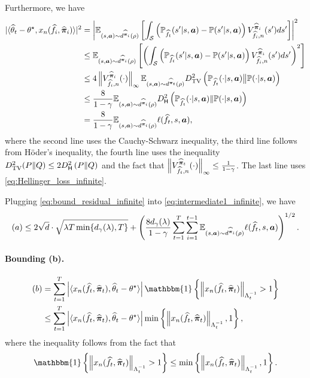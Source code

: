 Furthermore, we have
\begin{align}\label{eq:bound_residual_infinite}
|\langle \widehat{\theta}_t-\theta^\star,x_n(\widehat{f}_i,\widehat{{\bm{\pi}}}_i)\rangle|^2 &= \left|\mathbb{E}_{(s,{\bm{a}})\sim d^{\widehat{{\bm{\pi}}}_i}(\rho)}\left[\int_{\mathcal{S}} \left({\mathbb P}_{\widehat{f}_t}(s'|s,{\bm{a}})-{\mathbb P}(s'|s,{\bm{a}}) \right)V_{\widehat{f}_i,n}^{\widehat{{\bm{\pi}}}_i}(s')ds'\right]\right|^2\notag\\
&\leq \mathbb{E}_{(s,{\bm{a}})\sim d^{\widehat{{\bm{\pi}}}_i}(\rho)} \left[\left(\int_{\mathcal{S}} \left({\mathbb P}_{\widehat{f}_t}(s'|s,{\bm{a}})-{\mathbb P}(s'|s,{\bm{a}}) \right)V_{\widehat{f}_i,n}^{\widehat{{\bm{\pi}}}_i}(s')ds'\right)^2\right]\notag\\
&\leq 4\left\| V_{\widehat{f}_i,n}^{\widehat{{\bm{\pi}}}_i}(\cdot) \right\|_\infty\mathbb{E}_{(s,{\bm{a}})\sim d^{\widehat{{\bm{\pi}}}_t}(\rho)}D_{\textnormal{TV}}^2\left({\mathbb P}_{\widehat{f}_t}(\cdot|s,{\bm{a}})\big\|{\mathbb P}(\cdot|s,{\bm{a}})\right)\notag\\
&\leq \frac{8}{1-\gamma}\mathbb{E}_{(s,{\bm{a}})\sim d^{\widehat{{\bm{\pi}}}_i}(\rho)}D_{\mathsf{H}}^2\left({\mathbb P}_{\widehat{f}_t}(\cdot|s,{\bm{a}})\|{\mathbb P}(\cdot|s,{\bm{a}})\right)\notag\\
&=\frac{8}{1-\gamma} \mathbb{E}_{(s,{\bm{a}})\sim d^{\widehat{{\bm{\pi}}}_i}(\rho)}\ell(\widehat{f}_t,s,{\bm{a}}),
\end{align}
where the second line uses the Cauchy-Schwarz inequality, the third line follows from H\"oder's inequality,
the fourth line uses the inequality $D_{\textnormal{TV}}^2(P\|Q)\leq2D_{\mathsf{H}}^2\left(P\|Q\right)$
and the fact that $\left\| V_{\widehat{f}_t,n}^{\widehat{{\bm{\pi}}}_t}(\cdot) \right\|_\infty\leq \frac{1}{1-\gamma}$. The last line uses \eqref{eq:Hellinger_loss_infinite}.

Plugging \eqref{eq:bound_residual_infinite} into \eqref{eq:intermediate1_infinite}, we have
\begin{align}\label{eq:bound_a_infinite}
    (a)\leq 2\sqrt{d}\cdot\sqrt{\lambda T \min\{d_\gamma(\lambda),T\}} + \left(\frac{8d_\gamma(\lambda)}{1-\gamma}\sum_{t=1}^T \sum_{i=1}^{t-1} \mathbb{E}_{(s,{\bm{a}})\sim d^{\widehat{{\bm{\pi}}}_i}(\rho)}\ell(\widehat{f}_t,s,{\bm{a}})\right)^{1/2}.
\end{align}

\paragraph{Bounding (b).} 
\begin{align}\label{eq:bound_b_infinite_pre}
    (b) &= \sum_{t=1}^T \left| \langle x_n(\widehat{f}_t,\widehat{\vpi}_t),\widehat{\theta}_t-\theta^\star\rangle\right|\mathbbm{1}\left\{\norm{x_n(\widehat{f}_t,\widehat{\vpi}_t)}_{\Lambda_{t}^{-1}}> 1\right\}\notag\\
    &\leq \sum_{t=1}^T \left| \langle x_n(\widehat{f}_t,\widehat{\vpi}_t),\widehat{\theta}_t-\theta^\star\rangle\right|\min\left\{ \norm{x_n(\widehat{f}_t,\widehat{\vpi}_t)}_{\Lambda_{t}^{-1}},1\right\},
\end{align}
where the inequality follows from the fact that
$$
\mathbbm{1}\left\{\norm{x_n(\widehat{f}_t,\widehat{\vpi}_t)}_{\Lambda_{t}^{-1}}> 1\right\}\leq \min\left\{ \norm{x_n(\widehat{f}_t,\widehat{\vpi}_t)}_{\Lambda_{t}^{-1}},1\right\}.
$$

